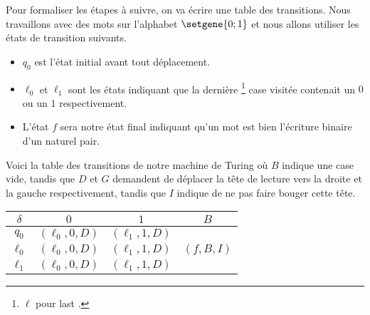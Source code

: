 Pour formaliser les étapes à suivre, on va écrire une table des transitions.
Nous travaillons avec des mots sur l'alphabet $\setgene{0 ; 1}$ et nous allons utiliser les états de transition suivants.

\begin{itemize}[label = \small\textbullet]
	\item $q_0$ est l'état initial avant tout déplacement.

	\item $\ell_0$ et $\ell_1$ sont les états indiquant que la dernière
	\footnote{
		$\ell$ pour \og{} last \fg{}.
	}
	case visitée contenait un $0$ ou un $1$ respectivement.

	\item L'état $f$ sera notre état final indiquant qu'un mot est bien l'écriture binaire d'un naturel pair.
\end{itemize}

Voici la table des transitions de notre machine de Turing où $B$ indique une case vide, tandis que $D$ et $G$ demandent de déplacer la tête de lecture \head{} vers la droite et la gauche respectivement, tandis que $I$ indique de ne pas faire bouger cette tête.
\begin{center}
	\begin{tabular}{|c||c|c|c|}
		\hline
		$\delta$ 
			& $0$ 
			& $1$
			& $B$ \\
		\hline
		\hline
		$q_0$
			& $(\ell_0 , 0 , D)$
			& $(\ell_1 , 1 , D)$
			& \\
		\hline
		\hline
		$\ell_0$
			& $(\ell_0 , 0 , D)$
			& $(\ell_1 , 1 , D)$
			& $(f , B , I)$\\
		\hline
		$\ell_1$
			& $(\ell_0 , 0 , D)$
			& $(\ell_1 , 1 , D)$
			& \\
		\hline
	\end{tabular}
\end{center}

